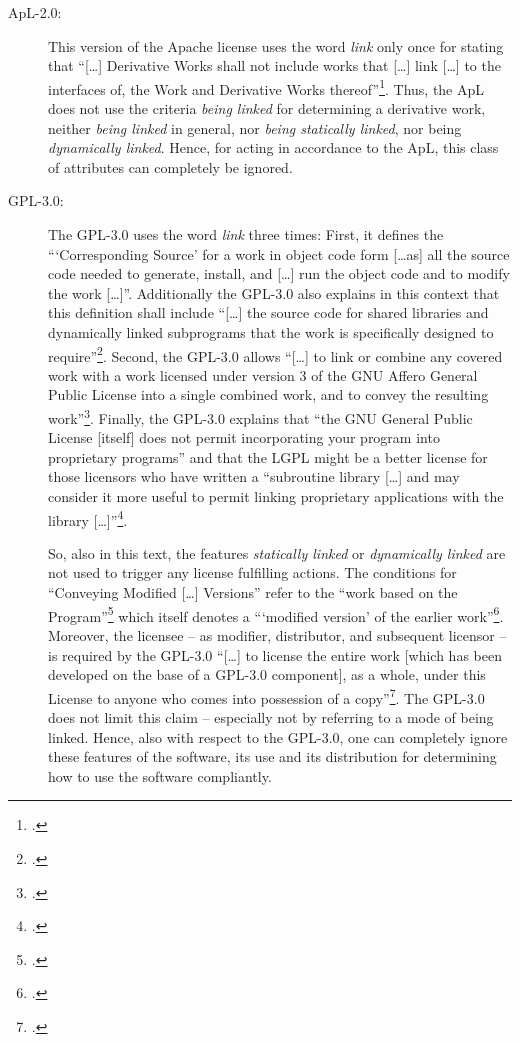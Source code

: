 \begin{description}

  \item[ApL-2.0:] This version of the Apache license uses the word \emph{link}
  only once for stating that \enquote{[\ldots] Derivative Works shall not
  include works that [\ldots] link [\ldots] to the interfaces of, the Work and
  Derivative Works thereof}\footcite [cf.][\nopage wp.\
  §0]{Apl20OsiLicense2004a}. Thus, the ApL does not use the criteria \emph{being
  linked} for determining a derivative work, neither \emph{being linked} in
  general, nor \emph{being statically linked}, nor being \emph{dynamically
  linked}. Hence, for acting in accordance to the ApL, this class of attributes
  can completely be ignored.

  \item[GPL-3.0:] The GPL-3.0 uses the word \emph{link} three times: First, it
  defines the \enquote{\enquote{Corresponding Source} for a work in object code
  form [\ldots as] all the source code needed to generate, install, and [\ldots]
  run the object code and to modify the work [\ldots]}. Additionally the GPL-3.0
  also explains in this context that this definition shall include
  \enquote{[\ldots] the source code for shared libraries and dynamically linked
  subprograms that the work is specifically designed to
  require}\footcite[cf.][\nopage wp.\ §0]{Gpl30OsiLicense2007a}. Second, the
  GPL-3.0 allows \enquote{[\ldots] to link or combine any covered work with a
  work licensed under version 3 of the GNU Affero General Public License into a
  single combined work, and to convey the resulting work}\footcite[cf.][\nopage
  wp.\ §13]{Gpl30OsiLicense2007a}. Finally, the GPL-3.0 explains that
  \enquote{the GNU General Public License [itself] does not permit incorporating
  your program into proprietary programs} and that the LGPL might be a better
  license for those licensors who have written a \enquote{subroutine library
  [\ldots] and may consider it more useful to permit linking proprietary
  applications with the library [\ldots]}\footcite[cf.][\nopage wp.\ last
  parapgraph]{Gpl30OsiLicense2007a}.
  
  So, also in this text, the features \emph{statically linked} or
  \emph{dynamically linked} are not used to trigger any license fulfilling
  actions. The conditions for \enquote{Conveying Modified [\ldots] Versions}
  refer to the \enquote{work based on the Program}\footcite[cf.][\nopage wp.\
  §5]{Gpl30OsiLicense2007a} which itself denotes a \enquote{\enquote{modified
  version} of the earlier work}\footcite[cf.][\nopage wp.\
  §0]{Gpl30OsiLicense2007a}. Moreover, the licensee -- as modifier, distributor,
  and subsequent licensor -- is required by the GPL-3.0 \enquote{[\ldots] to
  license the entire work [which has been developed on the base of a GPL-3.0
  component], as a whole, under this License to anyone who comes into possession
  of a copy}\footcite[cf.][\nopage wp.\ §5]{Gpl30OsiLicense2007a}. The GPL-3.0
  does not limit this claim -- especially not by referring to a mode of being
  linked. Hence, also with respect to the GPL-3.0, one can completely ignore
  these features of the software, its use and its distribution for determining
  how to use the software compliantly.


\end{description}
